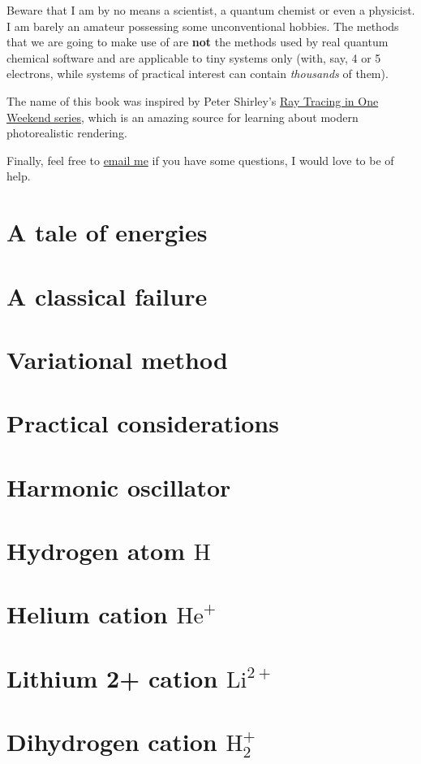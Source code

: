 \documentclass{book}
\newcommand{\molecule}[1]{\textrm{#1}}
\begin{document}
Beware that I am by no means a scientist, a quantum chemist or even a physicist. I am barely an amateur possessing some unconventional hobbies. The methods that we are going to make use of are \textbf{not} the methods used by real quantum chemical software and are applicable to tiny systems only (with, say, 4 or 5 electrons, while systems of practical interest can contain \textit{thousands} of them).

The name of this book was inspired by Peter Shirley's \href{https://raytracing.github.io}{Ray Tracing in One Weekend series}, which is an amazing source for learning about modern photorealistic rendering.

Finally, feel free to \href{mailto:lisyarus@gmail.com}{email me} if you have some questions, I would love to be of help.

\section{A tale of energies}
\section{A classical failure}
\section{Variational method} \label{sec:var}
\section{Practical considerations}
\section{Harmonic oscillator}
\section{Hydrogen atom \(\molecule{H}\)}
\section{Helium cation \(\molecule{He}^+\)} 
\section{Lithium 2+ cation \(\molecule{Li}^{2+}\)}
\section{Dihydrogen cation \(\molecule{H}_2^+\)}
\end{document}
